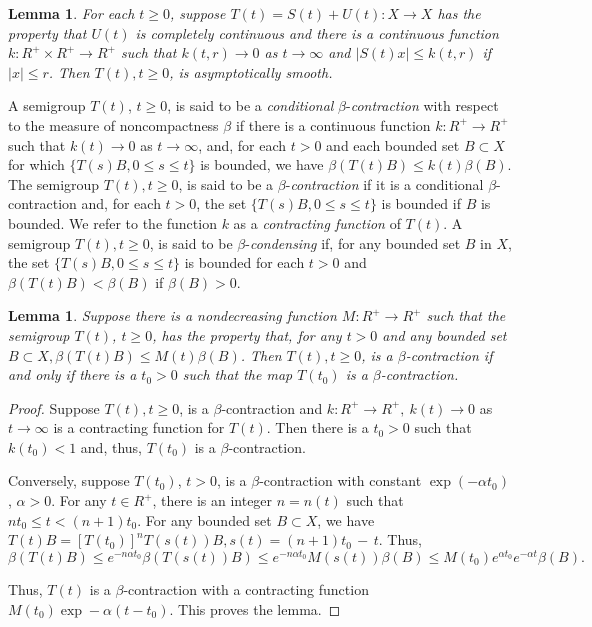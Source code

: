 \documentclass{surv-l}
\theoremstyle{plain}
\newtheorem{lemma}[theorem]{Lemma}
\theoremstyle{definition}
\numberwithin{equation}{section}
\numberwithin{figure}{chapter}
\begin{document}
\begin{lemma}\label{lem3.2.3} For each $t\geq 0$, suppose $T(t)=S(t)+U(t)\!:X\rightarrow X$ has the property that $U(t)$ is completely continuous and there is a continuous function $k\!:R^{+}\times R^{+}\rightarrow R^{+}$ such that $k(t, r)\rightarrow 0$ as $ t\rightarrow\infty$ and $|S(t)x|\leq k(t, r)$ if $|x|\leq r$. Then $T(t), t\geq 0$, is asymptotically smooth.
\end{lemma}

A semigroup $T(t)$, $t\geq 0$, is said to be a \emph{conditional} $\beta$-\emph{contraction} with respect to the measure of noncompactness $\beta$ if there is a continuous function $ k\!:R^{+}\rightarrow R^{+}$ such that $k(t)\rightarrow 0$ as $ t\rightarrow\infty$, and, for each $t>0$ and each bounded set $B\subset X$ for which $\{T(s)B, 0\leq s\leq t\}$ is bounded, we have $\beta(T(t)B)\leq k(t)\beta(B)$. The semigroup $T(t), t\geq 0$, is said to be a $\beta$-\emph{contraction} if it is a conditional $\beta$-contraction and, for each $t>0$, the set $\{T(s)B, 0\leq s\leq t\}$ is bounded if $B$ is bounded. We refer to the function $k$ as a \emph{contracting function} of $T(t)$. A semigroup $T(t), t\geq 0$, is said to be $\beta$-\emph{condensing} if, for any bounded set $B$ in $X$, the set $\{T(s)B, 0\leq s\leq t\}$ is bounded for each $t>0$ and $\beta(T(t)B)<\beta(B)$ if $\beta(B)>0$.

\begin{lemma}\label{lem3.2.4} Suppose there is a nondecreasing function $M\!:R^{+}\rightarrow R^{+}$ such that the semigroup $T(t)$, $t\geq 0$, has the property that, for any $t>0$ and any bounded set $B\subset X, \beta(T(t)B)\leq M(t)\beta(B)$. Then $T(t), t\geq 0$, is a $\beta$-contraction if and only if there is a $t_{0}>0$ such that the map $T(t_{0})$ is a $\beta$-contraction.
\end{lemma}

\begin{proof} Suppose $T(t), t\geq 0$, is a $\beta$-contraction and $k\!:R^{+}\rightarrow R^{+},\ k(t)\rightarrow 0$ as $ t\rightarrow\infty$ is a contracting function for $T(t)$. Then there is a $t_{0}>0$ such that $k(t_{0})<1$ and, thus, $T(t_{0})$ is a $\beta$-contraction.

Conversely, suppose $T(t_{0})$, $t>0$, is a $\beta$-contraction with constant $\exp(-\alpha t_{0})$, $\alpha>0$. For any $t\in R^{+}$, there is an integer $n=n(t)$ such that $nt_{0}\leq t< (n+1)t_{0}$. For any bounded set $B\subset X$, we have $T(t)B=[T(t_{0})]^{n}T(s(t))B, s(t)= (n+1)t_{0}\,-\,t$. Thus,
\begin{equation*}
\beta(T(t)B)\leq e^{-n\alpha t_{0}}\beta(T(s(t))B)\leq e^{-n\alpha t_{0}}M(s(t))\beta(B)\leq M(t_{0})e^{\alpha t_{0}}e^{-\alpha t}\beta(B).
\end{equation*}

Thus, $T(t)$ is a $\beta$-contraction with a contracting function $M(t_{0})\exp-\alpha(t-t_{0})$. This proves the lemma.
\end{proof}
\end{document}
